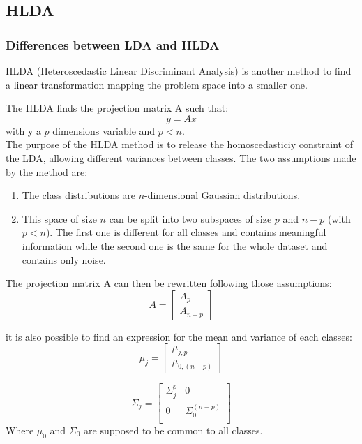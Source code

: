 \subsection{HLDA}

\subsubsection{Differences between LDA and HLDA}

HLDA (Heteroscedastic Linear Discriminant Analysis) is another method to find a linear transformation mapping the problem space into a smaller one.

The HLDA finds the projection matrix A such that:
$$y = Ax$$
with y a $p$ dimensions variable and $p < n$.\\

The purpose of the HLDA method is to release the homoscedasticiy constraint of the LDA, allowing different variances between classes. The two assumptions made by the method are:

\begin{enumerate}
  \item The class distributions are $n$-dimensional Gaussian distributions.
  \item This space of size $n$ can be split into two subspaces of size $p$
    and $n - p$ (with $p < n$). The first one is different for all classes and contains meaningful information while the second one is the same for the whole dataset and contains only noise.
\end{enumerate}

The projection matrix A can then be rewritten following those assumptions:
$$A = \left [
  \begin{array}{c}
    A_p\\
    A_{n-p}
  \end{array}
\right ]
$$

it is also possible to find an expression for the mean and variance of each classes:
$$\mu_j =
\left [
  \begin{array}{c}
    \mu_{j,p}\\
    \mu_{0,(n-p)}
  \end{array}
\right ]
$$

$$\Sigma_j =
\left [
  \begin{array}{cc}
    \Sigma_j^p & 0\\
    0 & \Sigma_0^{(n-p)}\\
  \end{array}
\right ]
$$
Where $\mu_0$ and $\Sigma_0$ are supposed to be common to all classes.

